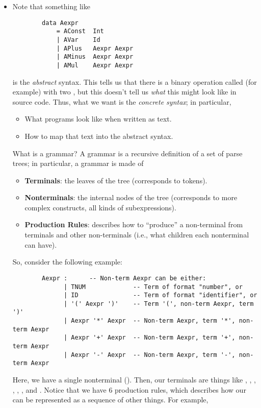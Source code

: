 \documentclass[letterpaper]{article}
\begin{document}
\begin{itemize}
    \item Note that something like 
    \begin{verbatim}
        data Aexpr 
            = AConst  Int
            | AVar    Id
            | APlus   Aexpr Aexpr
            | AMinus  Aexpr Aexpr
            | AMul    Aexpr Aexpr\end{verbatim}
    is the \emph{abstract} syntax. This tells us that there is a binary operation called (for example)  with two , but this doesn't tell us \emph{what} this might look like in source code. Thus, what we want is the \emph{concrete syntax}; in particular,
    \begin{itemize}
        \item What programs look like when written as text. 
        \item How to map that text into the abstract syntax. 
    \end{itemize}
    What is a grammar? A grammar is a recursive definition of a set of parse trees; in particular, a grammar is made of 
    \begin{itemize}
        \item \textbf{Terminals}: the leaves of the tree (corresponds to tokens).
        \item \textbf{Nonterminals}: the internal nodes of the tree (corresponds to more complex constructs, all kinds of subexpressions). 
        \item \textbf{Production Rules}: describes how to ``produce'' a non-terminal from terminals and other non-terminals (i.e., what children each nonterminal can have).
    \end{itemize}
    So, consider the following example:
    \begin{verbatim}
        Aexpr :      -- Non-term Aexpr can be either:
              | TNUM             -- Term of format "number", or
              | ID               -- Term of format "identifier", or
              | '(' Aexpr ')'    -- Term '(', non-term Aexpr, term ')'
              | Aexpr '*' Aexpr  -- Non-term Aexpr, term '*', non-term Aexpr
              | Aexpr '+' Aexpr  -- Non-term Aexpr, term '+', non-term Aexpr
              | Aexpr '-' Aexpr  -- Non-term Aexpr, term '-', non-term Aexpr\end{verbatim}
    Here, we have a single nonterminal (). Then, our terminals are things like , , , , , , and . Notice that we have 6 production rules, which describes how our  can be represented as a sequence of other things. For example, 

\end{itemize}
\end{document}
